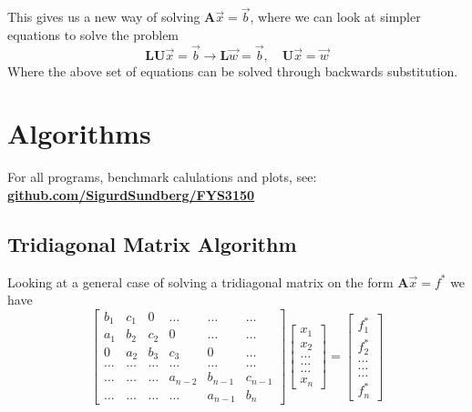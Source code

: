\documentclass[10pt, a4paper]{amsart}
\begin{document}
This gives us a new way of solving $\mathbf{A}\vec{x}=\vec{b}$, where we can look at simpler equations to solve the problem
\begin{equation}
\mathbf{L}\mathbf{U}\vec{x} = \vec{b} \rightarrow \mathbf{L}\vec{w} = \vec{b}, \quad \mathbf{U}\vec{x} = \vec{w}
\end{equation}
Where the above set of equations can be solved through backwards substitution. 

\section{Algorithms} 
For all programs, benchmark calulations and plots, see: \\
\href{https://github.com/SigurdSundberg/FYS3150/tree/master/project1}{\textbf{github.com/SigurdSundberg/FYS3150}}


\subsection{Tridiagonal Matrix Algorithm}
Looking at a general case of solving a tridiagonal matrix on the form $\mathbf{A}\vec{x} = f^*$ we have 
\begin{equation} 
	\begin{bmatrix}
		b_1 & c_1 & 0 &\dots &\dots &\dots \\
		a_1 & b_2 & c_2 & 0 &\dots &\dots\\
		0 & a_2 & b_3 & c_3 & 0 &\dots \\
		\dots &\dots &\dots &\dots &\dots &\dots\\
		\dots &\dots &\dots & a_{n-2} & b_{n-1} & c_{n-1} \\
		\dots &\dots &\dots &\dots &a_{n-1} & b_n
	\end{bmatrix}
	\begin{bmatrix}
		x_1 \\
		x_2 \\
		\dots \\
		\dots \\
		\dots \\
		x_n
	\end{bmatrix} 
	= 
	\begin{bmatrix}
		f^*_1\\
		f^*_2\\
		\dots \\
		\dots \\
		\dots \\
		f^*_n
	\end{bmatrix}
\end{equation}
\end{document}
